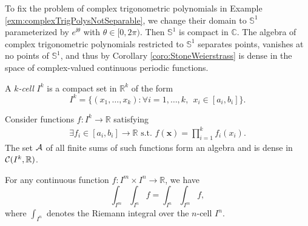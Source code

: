 \begin{exm}
  To fix the problem of complex trigonometric polynomials
  in Example \ref{exm:complexTrigPolysNotSeparable},
  we change their domain to $\mathbb{S}^1$
  parameterized by $e^{\ii \theta}$ with $\theta\in[0,2\pi)$.
  Then $\mathbb{S}^1$ is compact in $\mathbb{C}$. 
  The algebra of complex trigonometric polynomials
  restricted to $\mathbb{S}^1$ separates points, 
  vanishes at no points of $\mathbb{S}^1$,
  and thus by Corollary \ref{coro:StoneWeierstrass}
  is dense in the space of complex-valued continuous periodic functions.
\end{exm}

\begin{defn}
  \label{def:kCell}
  A \emph{$k$-cell} $I^k$ is a compact set in $\mathbb{R}^k$
  of the form
  \begin{equation}
    \label{eq:kCell}
    I^k = \{(x_1,\ldots, x_k): \forall i=1,\ldots,k,\ \ 
    x_i\in[a_i, b_i]\}. 
  \end{equation}
\end{defn}

\begin{lem}
  \label{lem:factoredFunc}
  Consider functions $f: I^k\rightarrow \mathbb{R}$
  satisfying
  \begin{equation}
    \label{eq:factoredFunc}
    \begin{array}{l}
      \exists f_i\in[a_i,b_i]\rightarrow \mathbb{R} \text{ s.t. }
      f(\mathbf{x}) = \prod_{i=1}^k f_i(x_i).
    \end{array}
  \end{equation}
  The set ${\cal A}$ of all finite sums of such functions
  form an algebra and is dense in ${\cal C}(I^k,\mathbb{R})$.
\end{lem}

\begin{coro}%
  \label{coro:FubiniOnKcell}
  For any continuous function $f: I^m\times I^n \rightarrow \mathbb{R}$,
  we have
  \begin{equation}
    \label{eq:FubiniOnKcell}
    \int_{I^m} \int_{I^n} f = \int_{I^n} \int_{I^m} f,
  \end{equation}
  where $\int_{I^n}$ denotes the Riemann integral
  over the $n$-cell $I^n$.
\end{coro}


